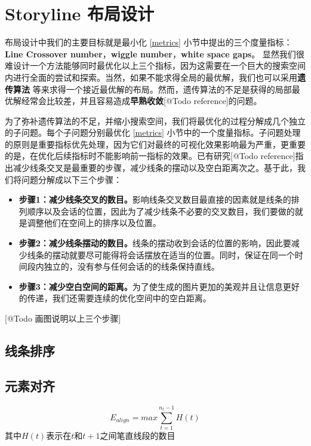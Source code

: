 \section{Storyline 布局设计}
布局设计中我们的主要目标就是最小化 \ref{metrics} 小节中提出的三个度量指标：\textbf{Line Crossover number}，\textbf{wiggle number}，\textbf{white space gaps}。 显然我们很难设计一个方法能够同时最优化以上三个指标，因为这需要在一个巨大的搜索空间内进行全面的尝试和探索。当然，如果不能求得全局的最优解，我们也可以采用\textbf{遗传算法}\cite{tanahashi2012design} 等来求得一个接近最优解的布局。然而，遗传算法的不足是获得的局部最优解经常会比较差，并且容易造成\textbf{早熟收敛}[@Todo reference]的问题。

为了弥补遗传算法的不足，并缩小搜索空间，我们将最优化的过程分解成几个独立的子问题。每个子问题分别最优化 \ref{metrics} 小节中的一个度量指标。子问题处理的原则是重要指标优先处理，因为它们对最终的可视化效果影响最为严重，更重要的是，在优化后续指标时不能影响前一指标的效果。已有研究[@Todo reference]指出减少线条交叉是最重要的步骤，减少线条的摆动以及空白距离次之。基于此，我们将问题分解成以下三个步骤：
\begin{itemize}
\item \textbf{步骤1：减少线条交叉的数目。}影响线条交叉数目最直接的因素就是线条的排列顺序以及会话的位置，因此为了减少线条不必要的交叉数目，我们要做的就是调整他们在空间上的排序以及位置。
\item \textbf{步骤2：减少线条摆动的数目。}线条的摆动收到会话的位置的影响，因此要减少线条的摆动就要尽可能得将会话摆放在适当的位置。同时，保证在同一个时间段内独立的，没有参与任何会话的的线条保持直线。
\item \textbf{步骤3：减少空白空间的距离。}为了使生成的图片更加的美观并且让信息更好的传递，我们还需要连续的优化空间中的空白距离。
\end{itemize}
 
 [@Todo 画图说明以上三个步骤]
 
\subsection{线条排序}

\subsection{元素对齐}
\begin{equation}
E_{align} = max \sum_{t=1}^{n_t-1} H\left(t\right)
\end{equation}
其中$H\left(t\right)$表示在$t$和$t+1$之间笔直线段的数目

